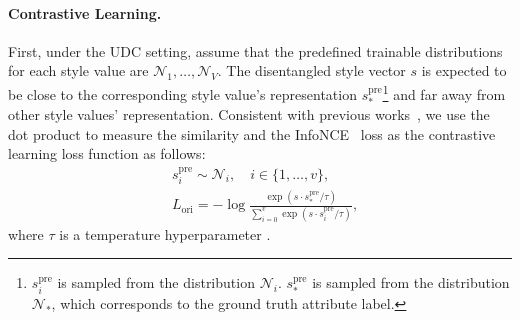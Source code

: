 \documentclass[11pt,a4paper]{article}
\renewcommand{\cite}{\citep}
\begin{document}
\paragraph{Contrastive Learning.}\label{sec:edcl}
First, under the UDC setting, assume that the predefined trainable distributions for each style value are $\mathcal N_1, \ldots, \mathcal N_V$. The disentangled style vector $s$ is expected to be close to the corresponding style value's representation $s^\text{pre}_*$\footnote{$s^\text{pre}_i$ is sampled from the distribution $\mathcal N_i$. $s^\text{pre}_*$ is sampled from the distribution $\mathcal N_*$, which corresponds to  the ground truth attribute label. } and far away from other style values' representation.  Consistent with previous works~\cite{he2020momentum}, we use the dot product to measure the similarity and the InfoNCE~\cite{oord2018representation} loss as the contrastive learning loss function as follows:
\begin{align}
    &s^\text{pre}_i \sim \mathcal N_i, \quad i\in \{1,\ldots, v\}, \\
    & L_\text{ori} = -\log\frac{\exp(s\cdot s^\text{pre}_*/\tau)}{\sum_{i=0}^v \exp(s\cdot s^\text{pre}_i/\tau)},
\end{align}
where $\tau$ is a temperature hyperparameter \cite{he2020momentum}.
\end{document}
